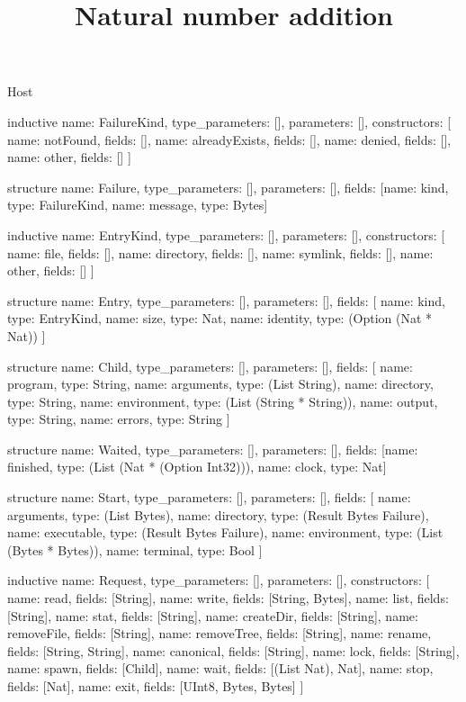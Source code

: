\begin{lexlean}{Host}
\title{Natural number addition}
\begin{semanticmodule}
inductive{
  name: FailureKind,
  type_parameters: [],
  parameters: [],
  constructors: [
    {name: notFound, fields: []},
    {name: alreadyExists, fields: []},
    {name: denied, fields: []},
    {name: other, fields: []}
  ]
}

structure{
  name: Failure,
  type_parameters: [],
  parameters: [],
  fields: [{name: kind, type: FailureKind}, {name: message, type: Bytes}]
}

inductive{
  name: EntryKind,
  type_parameters: [],
  parameters: [],
  constructors: [
    {name: file, fields: []},
    {name: directory, fields: []},
    {name: symlink, fields: []},
    {name: other, fields: []}
  ]
}

structure{
  name: Entry,
  type_parameters: [],
  parameters: [],
  fields: [
    {name: kind, type: EntryKind},
    {name: size, type: Nat},
    {name: identity, type: (Option (Nat * Nat))}
  ]
}

structure{
  name: Child,
  type_parameters: [],
  parameters: [],
  fields: [
    {name: program, type: String},
    {name: arguments, type: (List String)},
    {name: directory, type: String},
    {name: environment, type: (List (String * String))},
    {name: output, type: String},
    {name: errors, type: String}
  ]
}

structure{
  name: Waited,
  type_parameters: [],
  parameters: [],
  fields: [{name: finished, type: (List (Nat * (Option Int32)))}, {name: clock, type: Nat}]
}

structure{
  name: Start,
  type_parameters: [],
  parameters: [],
  fields: [
    {name: arguments, type: (List Bytes)},
    {name: directory, type: (Result Bytes Failure)},
    {name: executable, type: (Result Bytes Failure)},
    {name: environment, type: (List (Bytes * Bytes))},
    {name: terminal, type: Bool}
  ]
}

inductive{
  name: Request,
  type_parameters: [],
  parameters: [],
  constructors: [
    {name: read, fields: [String]},
    {name: write, fields: [String, Bytes]},
    {name: list, fields: [String]},
    {name: stat, fields: [String]},
    {name: createDir, fields: [String]},
    {name: removeFile, fields: [String]},
    {name: removeTree, fields: [String]},
    {name: rename, fields: [String, String]},
    {name: canonical, fields: [String]},
    {name: lock, fields: [String]},
    {name: spawn, fields: [Child]},
    {name: wait, fields: [(List Nat), Nat]},
    {name: stop, fields: [Nat]},
    {name: exit, fields: [UInt8, Bytes, Bytes]}
  ]
}


\end{semanticmodule}
\end{lexlean}
